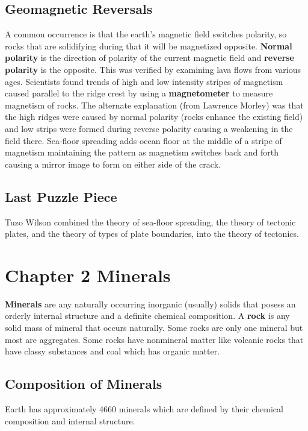 \documentclass{article}
\begin{document}
\subsection{Geomagnetic Reversals} %
\label{sub:geomagnetic_reversals}
A common occurrence is that the earth's magnetic field switches polarity, so rocks that are solidifying during that it will be magnetized opposite. \textbf{Normal polarity} is the direction of polarity of the current magnetic field and \textbf{reverse polarity} is the opposite. This was verified by examining lava flows from various ages. Scientists found trends of high and low intensity stripes of magnetism caused parallel to the ridge crest by using a \textbf{magnetometer} to measure magnetism of rocks. The alternate explanation (from Lawrence Morley) was that the high ridges were caused by normal polarity (rocks enhance the existing field) and low strips were formed during reverse polarity causing a weakening in the field there. Sea-floor spreading adds ocean floor at the middle of a stripe of magnetism maintaining the pattern as magnetism switches back and forth causing a mirror image to form on either side of the crack.

\subsection{Last Puzzle Piece} %
\label{sub:last_puzzle_piece}
Tuzo Wilson combined the theory of sea-floor spreading, the theory of tectonic plates, and the theory of types of plate boundaries, into the theory of tectonics.


\section{Chapter 2 Minerals} %
\label{sec:chapter_2}
\textbf{Minerals} are any naturally occurring inorganic (usually) solids that posess an orderly internal structure and a definite chemical composition. A \textbf{rock} is any solid mass of mineral that occurs naturally. Some rocks are only one mineral but most are aggregates. Some rocks have nonmineral matter like volcanic rocks that have classy substances and coal which has organic matter.

\subsection{Composition of Minerals} %
\label{sub:composition_of_minerals}
Earth has approximately 4660 minerals which are defined by their chemical composition and internal structure.
\end{document}

